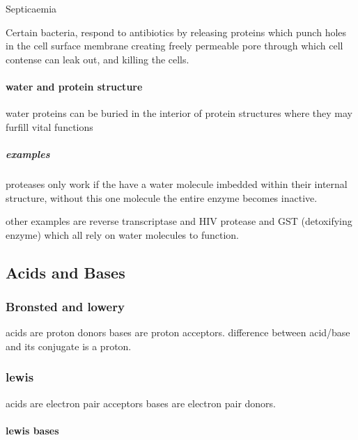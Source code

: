 \documentclass[]{article}
\let\oldparagraph\paragraph
\renewcommand{\paragraph}[1]{\oldparagraph{#1}\mbox{}}
\let\oldsubparagraph\subparagraph
\renewcommand{\subparagraph}[1]{\oldsubparagraph{#1}\mbox{}}
\begin{document}
Septicaemia

Certain bacteria, respond to antibiotics by releasing proteins which
punch holes in the cell surface membrane creating freely permeable pore
through which cell contense can leak out, and killing the cells.

\hypertarget{water-and-protein-structure}{%
\paragraph{water and protein
structure}\label{water-and-protein-structure}}

water proteins can be buried in the interior of protein structures where
they may furfill vital functions

\hypertarget{examples-1}{%
\subparagraph{examples}\label{examples-1}}

proteases only work if the have a water molecule imbedded within their
internal structure, without this one molecule the entire enzyme becomes
inactive.

other examples are reverse transcriptase and HIV protease and GST
(detoxifying enzyme) which all rely on water molecules to function.

\hypertarget{acids-and-bases}{%
\subsection{Acids and Bases}\label{acids-and-bases}}

\hypertarget{bronsted-and-lowery}{%
\subsubsection{Bronsted and lowery}\label{bronsted-and-lowery}}

acids are proton donors bases are proton acceptors. difference between
acid/base and its conjugate is a proton.

\hypertarget{lewis}{%
\subsubsection{lewis}\label{lewis}}

acids are electron pair acceptors bases are electron pair donors.

\hypertarget{lewis-bases}{%
\paragraph{lewis bases}\label{lewis-bases}}
\end{document}
